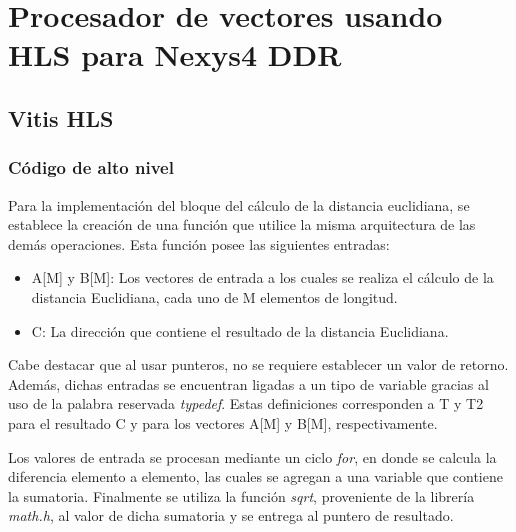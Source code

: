 \documentclass[conference]{IEEEtran}
\begin{document}
  \section{Procesador de vectores usando HLS para Nexys4 DDR} 
 
\subsection{Vitis HLS}

\subsubsection{Código de alto nivel}
Para la implementación del bloque del cálculo de la distancia  euclidiana, se establece la creación de una función que utilice la misma arquitectura de las demás operaciones. Esta función posee las siguientes entradas:

\begin{itemize}
    \item A[M] y B[M]: Los vectores de entrada a los cuales se realiza el cálculo de la distancia Euclidiana, cada uno de M elementos de longitud.
    \item C: La dirección que contiene el resultado de la distancia Euclidiana.
\end{itemize}

Cabe destacar que al usar punteros, no se requiere establecer un valor de retorno. Además, dichas entradas se encuentran ligadas a un tipo de variable gracias al uso de la palabra reservada \textit{typedef}. Estas definiciones corresponden a T y T2 para el  resultado C y para los vectores A[M] y B[M], respectivamente.

Los valores de entrada se procesan mediante un ciclo \textit{for}, en donde se calcula la diferencia elemento a elemento, las cuales se agregan a una variable que contiene la sumatoria. Finalmente se utiliza la función \textit{sqrt}, proveniente de la librería \textit{math.h}, al valor de dicha sumatoria y se entrega al puntero de resultado.
\end{document}

